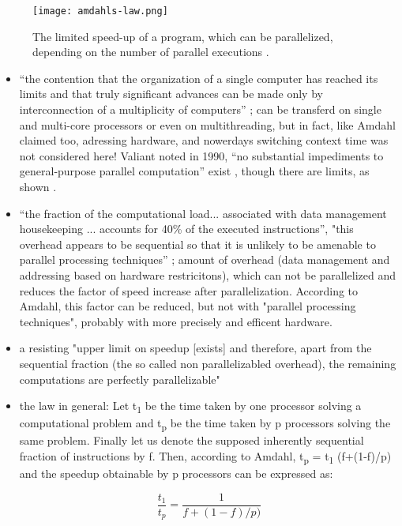 \begin{figure}[h!]
	\centering
	\texttt{[image: amdahls-law.png]}
	\caption{
		The limited speed-up of a program, which can be parallelized, depending on the number of parallel executions \parencite{image1}.
	}
	\label{fig:admLaw}
\end{figure}

\begin{itemize}
\item “the contention that the organization of a single computer has reached its limits and that
truly significant advances can be made only by interconnection of a multiplicity of computers” \parencite[see][p80]{inbook1}; can be transferd on single and multi-core processors or even on multithreading, but in fact, like Amdahl claimed too, adressing hardware, and nowerdays switching context time was not considered here!
Valiant noted in 1990, “no substantial impediments to general-purpose parallel
computation” exist \parencite[see][p85]{inbook1}, though there are limits, as shown \parencite[seein Sec. 10][p85]{inbook1}.
\item “the fraction of the computational load... associated with data management housekeeping ... accounts for 40\% of the executed instructions”, "this overhead appears to be sequential so that it is unlikely to be amenable to parallel processing techniques” \parencite[see][p80]{inbook1}; amount of overhead (data management and addressing based on hardware restricitons), which can not be parallelized and reduces the factor of speed increase after parallelization. According to Amdahl, this factor can be reduced, but not with "parallel processing techniques", probably with more precisely and efficent hardware.

\newpage

\item a resisting "upper limit on speedup [exists] and therefore, apart from the sequential fraction (the so called non parallelizabled overhead), the remaining computations are perfectly parallelizable" \parencite[see][p81]{inbook1}
\item the law in general: Let t\textsubscript{1} be the time taken by one processor solving a computational problem and t\textsubscript{p} be the time taken by p processors solving the same problem. Finally let us denote the supposed inherently sequential fraction of instructions by f. Then, according to Amdahl, t\textsubscript{p} = t\textsubscript{1} (f+(1-f)/p) and the speedup obtainable by p processors can be expressed as:

	
\[ \frac{t_1}{t_p} = \frac{1}{f + (1 - f) / p)} \]
\end{itemize}

